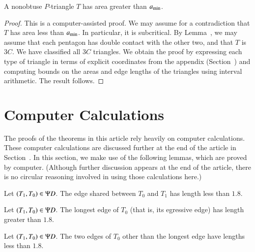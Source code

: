 \begin{lemma}  
A nonobtuse $P$-triangle $T$ has area greater than $a_\text{min}$.
\end{lemma}

\begin{proof} 
  This is a computer-assisted proof.  We may assume for a contradiction
  that $T$ has area less than $a_\text{min}$.  In particular, it is
  subcritical.  By Lemma~, we may assume that each
  pentagon has double contact with the other two, and that $T$ is
  $3C$.  We have classified all $3C$ triangles.  We obtain the proof
  by expressing each type of triangle in terms of explicit
  coordinates from the appendix (Section~) and
  computing bounds on the areas and edge lengths of the triangles
  using interval arithmetic.  The result follows.
\end{proof}

\section{Computer Calculations}

The proofs of the theorems in this article rely heavily on computer
calculations.  These computer calculations are discussed further at
the end of the article in Section~.  In this section,
we make use of the following lemmas, which are proved by computer.
(Although further discussion appears at the end of the article, there
is no circular reasoning involved in using those calculations here.)

\begin{lemma}  
Let $(T_1,T_0)\in \Psi D$.  The edge shared between
$T_0$ and $T_1$ has length less than $1.8$. 
\end{lemma}

\begin{lemma} 
  Let $(T_1,T_0)\in \Psi D$.  The longest edge of $T_0$ (that is, its
  egressive edge) has length greater than $1.8$.
\end{lemma}

\begin{lemma}  
  Let $(T_1,T_0)\in \Psi D$.  The two edges of $T_0$ other than the
  longest edge have lengths less than $1.8$.
\end{lemma}

